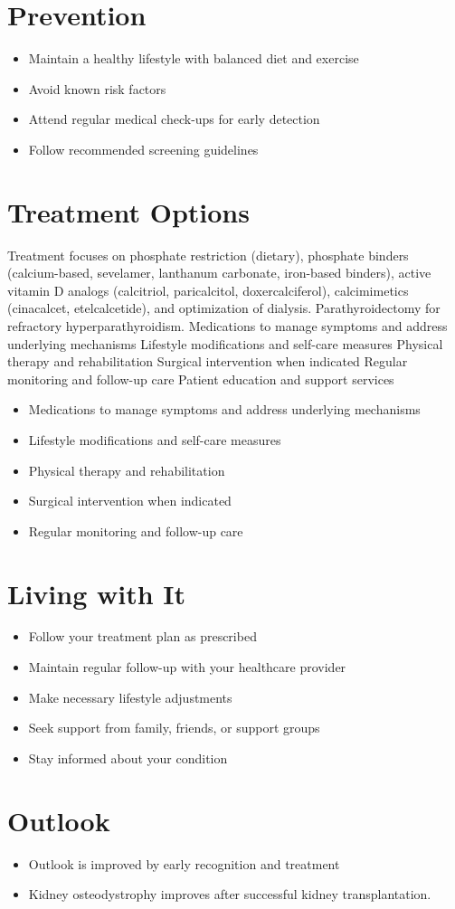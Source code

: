 \section{Prevention}
\begin{itemize}[noitemsep]
  \item Maintain a healthy lifestyle with balanced diet and exercise
  \item Avoid known risk factors
  \item Attend regular medical check-ups for early detection
  \item Follow recommended screening guidelines
\end{itemize}
\section{Treatment Options}
Treatment focuses on phosphate restriction (dietary), phosphate binders (calcium-based, sevelamer, lanthanum carbonate, iron-based binders), active vitamin D analogs (calcitriol, paricalcitol, doxercalciferol), calcimimetics (cinacalcet, etelcalcetide), and optimization of dialysis. Parathyroidectomy for refractory hyperparathyroidism. Medications to manage symptoms and address underlying mechanisms Lifestyle modifications and self-care measures Physical therapy and rehabilitation Surgical intervention when indicated Regular monitoring and follow-up care Patient education and support services

\begin{itemize}[noitemsep]
  \item Medications to manage symptoms and address underlying mechanisms
  \item Lifestyle modifications and self-care measures
  \item Physical therapy and rehabilitation
  \item Surgical intervention when indicated
  \item Regular monitoring and follow-up care
\end{itemize}
\section{Living with It}
\begin{itemize}[noitemsep]
  \item Follow your treatment plan as prescribed
  \item Maintain regular follow-up with your healthcare provider
  \item Make necessary lifestyle adjustments
  \item Seek support from family, friends, or support groups
  \item Stay informed about your condition
\end{itemize}
\section{Outlook}
\begin{itemize}[noitemsep]
  \item Outlook is improved by early recognition and treatment
  \item Kidney osteodystrophy improves after successful kidney transplantation.
\end{itemize}
